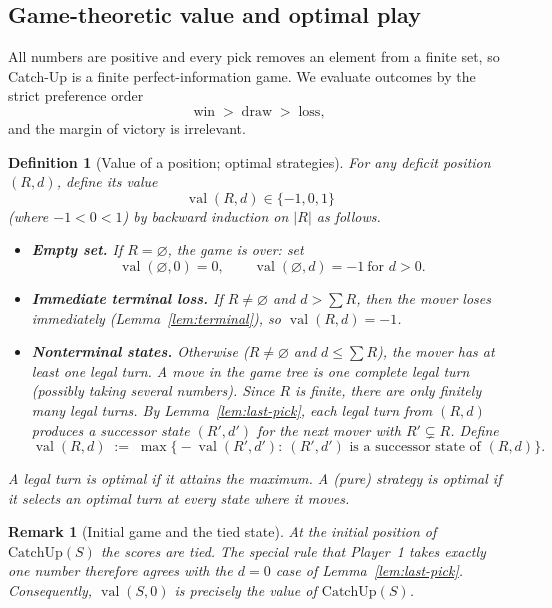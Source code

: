 \documentclass[11pt]{article}
\newtheorem{definition}[theorem]{Definition}
\newtheorem{remark}[theorem]{Remark}
\newcommand{\CatchUp}{\mathrm{CatchUp}}
\newcommand{\val}{\operatorname{val}}
\begin{document}
\subsection{Game-theoretic value and optimal play}\label{subsec:value}

All numbers are positive and every pick removes an element from a finite set, so Catch-Up is a finite perfect-information game.
We evaluate outcomes by the strict preference order
\[
\text{win} \;>\; \text{draw} \;>\; \text{loss},
\]
and the margin of victory is irrelevant.

\begin{definition}[Value of a position; optimal strategies]\label{def:value}
For any deficit position $(R,d)$, define its \emph{value}
\[
\val(R,d)\in\{-1,0,1\}
\]
(where $-1<0<1$) by backward induction on $|R|$ as follows.

\begin{itemize}
\item \textbf{Empty set.} If $R=\varnothing$, the game is over: set
\[
\val(\varnothing,0)=0,\qquad \val(\varnothing,d)=-1\ \text{for }d>0.
\]

\item \textbf{Immediate terminal loss.} If $R\neq\varnothing$ and $d>\sum R$, then the mover loses immediately
(Lemma~\ref{lem:terminal}), so $\val(R,d)=-1$.

\item \textbf{Nonterminal states.} Otherwise ($R\neq\varnothing$ and $d\le\sum R$), the mover has at least one legal turn.
A \emph{move} in the game tree is one complete legal \emph{turn} (possibly taking several numbers). Since $R$ is finite,
there are only finitely many legal turns.
By Lemma~\ref{lem:last-pick}, each legal turn from $(R,d)$ produces a successor state $(R',d')$ for the next mover with $R'\subsetneq R$.
Define
\[
\val(R,d)\;:=\;\max\bigl\{-\val(R',d'):\ (R',d')\text{ is a successor state of }(R,d)\bigr\}.
\]
\end{itemize}

A legal turn is \emph{optimal} if it attains the maximum. A (pure) strategy is \emph{optimal} if it selects an optimal turn at every state where it moves.
\end{definition}

\begin{remark}[Initial game and the tied state]\label{rem:initial-value}
At the initial position of $\CatchUp(S)$ the scores are tied. The special rule that Player~1 takes exactly one number
therefore agrees with the $d=0$ case of Lemma~\ref{lem:last-pick}. Consequently, $\val(S,0)$ is precisely the value of
$\CatchUp(S)$.
\end{remark}
\end{document}
